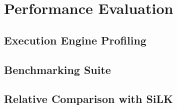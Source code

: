 \chapter{Performance Evaluation}\label{ch:performance-evaluation}

\section{Execution Engine Profiling}\label{sec:engine-profiling}

\section{Benchmarking Suite}\label{sec:benchmarking-suite}

\section{Relative Comparison with SiLK}\label{sec:silk-relative-comparison}


